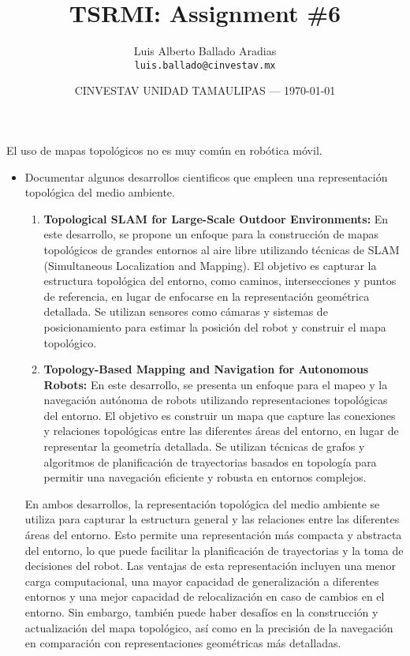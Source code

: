 \documentclass{article}
\title{TSRMI: Assignment \#6} %
\author{Luis Alberto Ballado Aradias\\ \texttt{luis.ballado@cinvestav.mx}} %
\date{CINVESTAV UNIDAD TAMAULIPAS --- \today} %
\begin{document}
\maketitle %

El uso de mapas topológicos no es muy común en robótica móvil.\\

\begin{itemize} %
\item Documentar algunos desarrollos cientificos que empleen una representación topológica del medio ambiente.

  \begin{enumerate}
  \item \textbf{Topological SLAM for Large-Scale Outdoor Environments:} En este desarrollo, se propone un enfoque para la construcción de mapas topológicos de grandes entornos al aire libre utilizando técnicas de SLAM (Simultaneous Localization and Mapping). El objetivo es capturar la estructura topológica del entorno, como caminos, intersecciones y puntos de referencia, en lugar de enfocarse en la representación geométrica detallada. Se utilizan sensores como cámaras y sistemas de posicionamiento para estimar la posición del robot y construir el mapa topológico.
  \item \textbf{Topology-Based Mapping and Navigation for Autonomous Robots:} En este desarrollo, se presenta un enfoque para el mapeo y la navegación autónoma de robots utilizando representaciones topológicas del entorno. El objetivo es construir un mapa que capture las conexiones y relaciones topológicas entre las diferentes áreas del entorno, en lugar de representar la geometría detallada. Se utilizan técnicas de grafos y algoritmos de planificación de trayectorias basados en topología para permitir una navegación eficiente y robusta en entornos complejos.
    
  \end{enumerate}

  En ambos desarrollos, la representación topológica del medio ambiente se utiliza para capturar la estructura general y las relaciones entre las diferentes áreas del entorno. Esto permite una representación más compacta y abstracta del entorno, lo que puede facilitar la planificación de trayectorias y la toma de decisiones del robot. Las ventajas de esta representación incluyen una menor carga computacional, una mayor capacidad de generalización a diferentes entornos y una mejor capacidad de relocalización en caso de cambios en el entorno. Sin embargo, también puede haber desafíos en la construcción y actualización del mapa topológico, así como en la precisión de la navegación en comparación con representaciones geométricas más detalladas.
    

\end{itemize}
\end{document}
